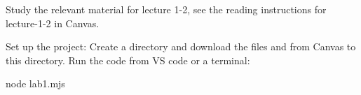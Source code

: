 \documentclass[fleqn, article, a4paper]{memoir}
\begin{document}
\begin{Assignments}

\item Study the relevant material for lecture 1-2, see the reading instructions for lecture-1-2 in Canvas. 


\item %
Set up the project: Create a directory and download the files  and  from Canvas to this directory. Run the code from VS code or a terminal:
\begin{Code}
node lab1.mjs
\end{Code}




\end{Assignments}
\end{document}
